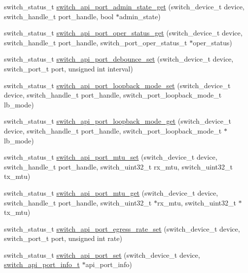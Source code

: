 \begin{DoxyCompactItemize}
\item 
switch\+\_\+status\+\_\+t \hyperlink{group__Port_ga6b5350479565af6ade70298f5ddda43d}{switch\+\_\+api\+\_\+port\+\_\+admin\+\_\+state\+\_\+get} (switch\+\_\+device\+\_\+t device, switch\+\_\+handle\+\_\+t port\+\_\+handle, bool $\ast$admin\+\_\+state)
\item 
switch\+\_\+status\+\_\+t \hyperlink{group__Port_gaaaf46ccd32903f34c23ca9d8c0b8d4ba}{switch\+\_\+api\+\_\+port\+\_\+oper\+\_\+status\+\_\+get} (switch\+\_\+device\+\_\+t device, switch\+\_\+handle\+\_\+t port\+\_\+handle, switch\+\_\+port\+\_\+oper\+\_\+status\+\_\+t $\ast$oper\+\_\+status)
\item 
switch\+\_\+status\+\_\+t \hyperlink{group__Port_ga34d4ddbb6d0bc100e803641c3fe7ef3f}{switch\+\_\+api\+\_\+port\+\_\+debounce\+\_\+set} (switch\+\_\+device\+\_\+t device, switch\+\_\+port\+\_\+t port, unsigned int interval)
\item 
switch\+\_\+status\+\_\+t \hyperlink{group__Port_gaf4533302a9f1c26a8b7042029c9a15a3}{switch\+\_\+api\+\_\+port\+\_\+loopback\+\_\+mode\+\_\+set} (switch\+\_\+device\+\_\+t device, switch\+\_\+handle\+\_\+t port\+\_\+handle, switch\+\_\+port\+\_\+loopback\+\_\+mode\+\_\+t lb\+\_\+mode)
\item 
switch\+\_\+status\+\_\+t \hyperlink{group__Port_gabfe8e083320c55388d25ee4d15358fb1}{switch\+\_\+api\+\_\+port\+\_\+loopback\+\_\+mode\+\_\+get} (switch\+\_\+device\+\_\+t device, switch\+\_\+handle\+\_\+t port\+\_\+handle, switch\+\_\+port\+\_\+loopback\+\_\+mode\+\_\+t $\ast$lb\+\_\+mode)
\item 
switch\+\_\+status\+\_\+t \hyperlink{group__Port_ga9fa02691bc276e0584146ba6d7a51377}{switch\+\_\+api\+\_\+port\+\_\+mtu\+\_\+set} (switch\+\_\+device\+\_\+t device, switch\+\_\+handle\+\_\+t port\+\_\+handle, switch\+\_\+uint32\+\_\+t rx\+\_\+mtu, switch\+\_\+uint32\+\_\+t tx\+\_\+mtu)
\item 
switch\+\_\+status\+\_\+t \hyperlink{group__Port_gabcaecdc5f3c11c0c3ab54ceae74e8f7e}{switch\+\_\+api\+\_\+port\+\_\+mtu\+\_\+get} (switch\+\_\+device\+\_\+t device, switch\+\_\+handle\+\_\+t port\+\_\+handle, switch\+\_\+uint32\+\_\+t $\ast$rx\+\_\+mtu, switch\+\_\+uint32\+\_\+t $\ast$tx\+\_\+mtu)
\item 
switch\+\_\+status\+\_\+t \hyperlink{group__Port_ga6a33966b85c44a7f371f976a0eacc966}{switch\+\_\+api\+\_\+port\+\_\+egress\+\_\+rate\+\_\+set} (switch\+\_\+device\+\_\+t device, switch\+\_\+port\+\_\+t port, unsigned int rate)
\item 
switch\+\_\+status\+\_\+t \hyperlink{group__Port_ga0df026f78db7fea364622bd6b8fda283}{switch\+\_\+api\+\_\+port\+\_\+set} (switch\+\_\+device\+\_\+t device, \hyperlink{structswitch__api__port__info__s}{switch\+\_\+api\+\_\+port\+\_\+info\+\_\+t} $\ast$api\+\_\+port\+\_\+info)

\end{DoxyCompactItemize}
